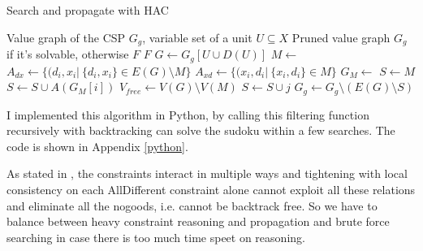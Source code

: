 \documentclass[a4paper, 12pt]{report}
\begin{document}
            \begin{algorithm}
                \caption{Search and propagate with HAC}
                \label{HAC}
                \begin{algorithmic}[1]
                    \Require Value graph of the CSP $G_g$, variable set of a unit $U\subseteq X$
                    \Ensure Pruned value graph $G_g$ if it's solvable, otherwise $F$
                            \State \Return $F$
                        \EndIf
                        \State $G\gets G_g[U\cup D(U)]$ 
                        \State $M\gets$ 
                        \State $A_{dx}\gets \{(d_i,x_i|\ \{d_i,x_i\}\in E(G)\setminus M \}$
                        \State $A_{xd}\gets \{(x_i,d_i|\ \{x_i,d_i\}\in M\}$ 
                        \State $G_M\gets$ 
                        \State $S\gets M$
                            \State $S \gets S\cup A(G_M[i])$
                        \EndFor
                        \State $V_{free} \gets V(G)\setminus V(M)$
                             
                                    \State $S\gets S\cup j$
                                \EndFor
                            \EndFor
                        \EndIf
                        \State $G_g\gets G_g \setminus(E(G)\setminus S)$
                    \EndFunction
                \end{algorithmic}
            \end{algorithm}

            I implemented this algorithm in Python, by calling this filtering function recursively with backtracking can solve the sudoku within a few searches. The code is shown in Appendix \ref{python}.
                        

            As stated in \cite{simonis2005sudoku}, the constraints interact in multiple ways and tightening with local consistency on each AllDifferent constraint alone cannot exploit all these relations and eliminate all the nogoods, i.e. cannot be backtrack free. So we have to balance between heavy constraint reasoning and propagation and brute force searching in case there is too much time speet on reasoning.
\end{document}
